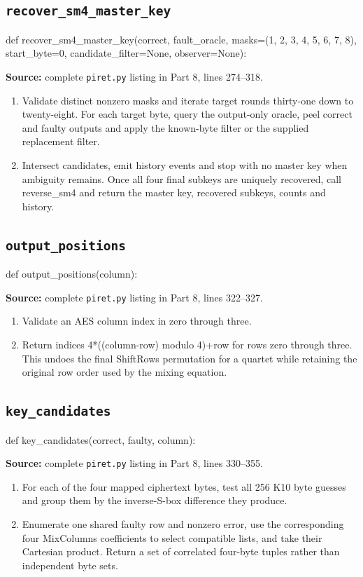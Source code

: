 \subsection{\texttt{recover\_\allowbreak{}sm4\_\allowbreak{}master\_\allowbreak{}key}}
\begin{lightcode}
def recover_sm4_master_key(correct, fault_oracle, masks=(1, 2, 3, 4, 5, 6, 7, 8), start_byte=0, candidate_filter=None, observer=None):
\end{lightcode}
\noindent\textbf{Source:} complete \texttt{piret.py} listing in Part 8, lines 274--318.
\begin{enumerate}
\item Validate distinct nonzero masks and iterate target rounds thirty-one down to twenty-eight. For each target byte, query the output-only oracle, peel correct and faulty outputs and apply the known-byte filter or the supplied replacement filter.
\item Intersect candidates, emit history events and stop with no master key when ambiguity remains. Once all four final subkeys are uniquely recovered, call reverse\_sm4 and return the master key, recovered subkeys, counts and history.
\end{enumerate}
\subsection{\texttt{output\_\allowbreak{}positions}}
\begin{lightcode}
def output_positions(column):
\end{lightcode}
\noindent\textbf{Source:} complete \texttt{piret.py} listing in Part 8, lines 322--327.
\begin{enumerate}
\item Validate an AES column index in zero through three.
\item Return indices 4*((column-row) modulo 4)+row for rows zero through three. This undoes the final ShiftRows permutation for a quartet while retaining the original row order used by the mixing equation.
\end{enumerate}
\subsection{\texttt{key\_\allowbreak{}candidates}}
\begin{lightcode}
def key_candidates(correct, faulty, column):
\end{lightcode}
\noindent\textbf{Source:} complete \texttt{piret.py} listing in Part 8, lines 330--355.
\begin{enumerate}
\item For each of the four mapped ciphertext bytes, test all 256 K10 byte guesses and group them by the inverse-S-box difference they produce.
\item Enumerate one shared faulty row and nonzero error, use the corresponding four MixColumns coefficients to select compatible lists, and take their Cartesian product. Return a set of correlated four-byte tuples rather than independent byte sets.
\end{enumerate}
